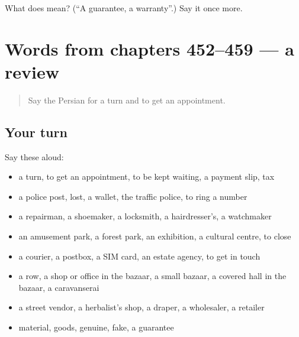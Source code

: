 \begin{tcolorbox}[breakable,colback=teal!4,colframe=teal!35!black,title={Before you move on}]
What does  mean? (\textquotedblleft{}A guarantee, a warranty\textquotedblright{}.) Say it once more.
\end{tcolorbox}
\section[(dialogue)]{Words from chapters 452–459 — a review}

\label{lesson:FA-R459-review-452-459}



\begin{quote}
Say the Persian for a turn and to get an appointment.
\end{quote}

\subsection*{Your turn}
Say these aloud:

\begin{itemize}
\raggedright
  \item a turn, to get an appointment, to be kept waiting, a payment slip, tax
  \item a police post, lost, a wallet, the traffic police, to ring a number
  \item a repairman, a shoemaker, a locksmith, a hairdresser's, a watchmaker
  \item an amusement park, a forest park, an exhibition, a cultural centre, to close
  \item a courier, a postbox, a SIM card, an estate agency, to get in touch
  \item a row, a shop or office in the bazaar, a small bazaar, a covered hall in the bazaar, a caravanserai
  \item a street vendor, a herbalist's shop, a draper, a wholesaler, a retailer
  \item material, goods, genuine, fake, a guarantee
\end{itemize}

